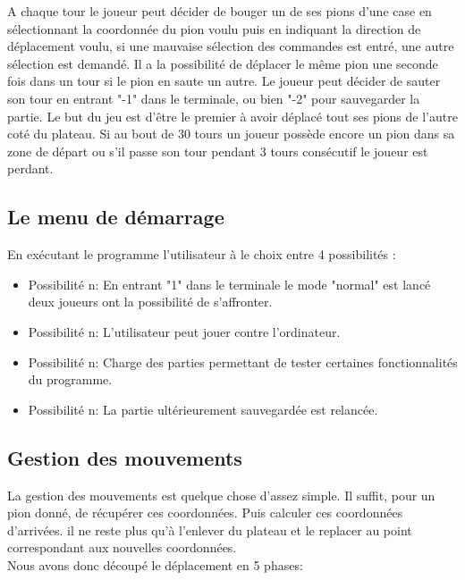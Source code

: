 \documentclass{article}
\begin{document}
        A chaque tour le joueur peut décider de bouger un de ses pions d'une case en sélectionnant la coordonnée du pion voulu puis en indiquant la direction de déplacement voulu, si une mauvaise sélection des commandes est entré, une autre sélection est demandé. Il a la possibilité de déplacer le même pion une seconde fois dans un tour si le pion en saute un autre. Le joueur peut décider de sauter son tour en entrant "-1" dans le terminale, ou bien "-2" pour sauvegarder la partie. 
        Le but du jeu est d'être le premier à avoir déplacé tout ses pions de l'autre coté du plateau. Si au bout de 30 tours un joueur possède encore un pion dans sa zone de départ ou s'il passe son tour pendant 3 tours consécutif le joueur est perdant.
        
    \subsection{Le menu de démarrage}
    
        En exécutant le programme l'utilisateur à le choix entre 4 possibilités :
        
        \begin{itemize}
        
            \item Possibilité n: En entrant "1" dans le terminale le mode "normal" est lancé deux joueurs ont la possibilité de s'affronter.
            
            \item Possibilité n: L'utilisateur peut jouer contre l'ordinateur.
            
            \item Possibilité n: Charge des parties permettant de tester certaines fonctionnalités du programme.
            
            \item Possibilité n: La partie ultérieurement sauvegardée est relancée. 
        
        \end{itemize}

\pagebreak

\subsection{Gestion des mouvements}
        La gestion des mouvements est quelque chose d'assez simple. Il suffit, pour un pion donné, de récupérer ces coordonnées. Puis calculer ces coordonnées d'arrivées. il ne reste plus qu'à l'enlever du plateau et le replacer au point correspondant aux nouvelles coordonnées. \\
Nous avons donc découpé le déplacement en 5 phases:
\end{document}
